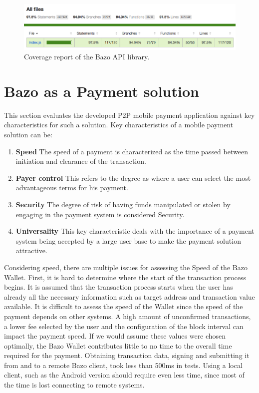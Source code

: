 \begin{figure}
\centering
\includegraphics[width=1\textwidth]{screenshots/bazo-api-testing.png}
\caption{\label{fig:coverage}Coverage report of the Bazo API library.}
\end{figure}
\section{Bazo as a Payment solution}
This section evaluates the developed P2P mobile payment application against key characteristics for such a solution. Key characteristics of a mobile payment solution can be:
\begin{enumerate}
\item \textbf{Speed}
The speed of a payment is characterized as the time passed between initiation and clearance of the transaction.
\item \textbf{Payer control}
This refers to the degree as where a user can select the most advantageous terms for his payment.
\item \textbf{Security}
The degree of risk of having funds manipulated or stolen by engaging in the payment system is considered Security.
\item \textbf{Universality}
This key characteristic deals with the importance of a payment system being accepted by a large user base to make the payment solution attractive.
\end{enumerate}

Considering speed, there are multiple issues for assessing the Speed of the Bazo Wallet. First, it is hard to determine where the start of the transaction process begins. It is assumed that the transaction process starts when the user has already all the necessary information such as target address and transaction value available. It is difficult to assess the speed of the Wallet since the speed of the payment depends on other systems. A high amount of unconfirmed transactions, a lower fee selected by the user and the configuration of the block interval can impact the payment speed. If we would assume these values were chosen optimally, the Bazo Wallet contributes little to no time to the overall time required for the payment. Obtaining transaction data, signing and submitting it from and to a remote Bazo client, took less than 500ms in tests. Using a local client, such as the Android version should require even less time, since most of the time is lost connecting to remote systems.

